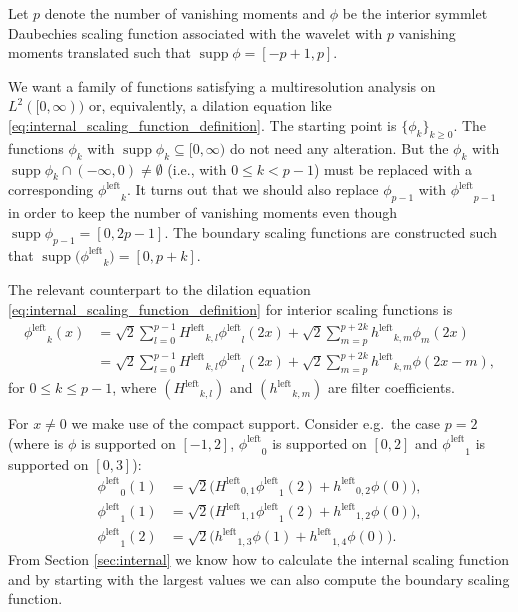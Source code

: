 \documentclass[a4paper]{scrartcl}
\newcommand\lphi{\ensuremath{\phi^{\text{left}}}}
\newcommand\lH{\ensuremath{H^{\text{left}}}}
\newcommand\lh{\ensuremath{h^{\text{left}}}}
\DeclareMathOperator\supp{supp}
\begin{document}
Let $p$ denote the number of vanishing moments and $\phi$ be the interior symmlet Daubechies scaling function associated with the wavelet with $p$ vanishing moments translated such that $\supp\phi = [-p+1, p]$.

We want a family of functions satisfying a multiresolution analysis on $L^2([0,\infty))$ or, equivalently, a dilation equation like \cref{eq:internal_scaling_function_definition}.
The starting point is $\{\phi_k\}_{k\geq 0}$.
The functions $\phi_k$ with $\supp\phi_k \subseteq [0,\infty)$ do not need any alteration.
But the $\phi_k$ with $\supp\phi_k \cap (-\infty,0) \neq \emptyset$ (i.e., with $0\leq k < p-1$) must be replaced with a corresponding $\lphi_k$.
It turns out that we should also replace $\phi_{p-1}$ with $\lphi_{p-1}$ in order to keep the number of vanishing moments even though $\supp\phi_{p-1} = [0,2p-1]$.
The boundary scaling functions are constructed such that $\supp\bigl(\lphi_k\bigr) = [0,p+k]$.

The relevant counterpart to the dilation equation \cref{eq:internal_scaling_function_definition} for interior scaling functions is
\begin{align}
	\lphi_k(x)
	& = \sqrt2 \sum_{l=0}^{p-1} \lH_{k,l} \lphi_l(2x) + \sqrt2 \sum_{m=p}^{p+2k} \lh_{k,m} \phi_m(2x)
	\nonumber
	\\
	& = \sqrt2 \sum_{l=0}^{p-1} \lH_{k,l} \lphi_l(2x) + \sqrt2 \sum_{m=p}^{p+2k} \lh_{k,m} \phi(2x-m),
	\label{eq:left_scaling_function_definition}
\end{align}
for $0\leq k\leq p-1$, where $(\lH_{k,l})$ and $(\lh_{k,m})$ are filter coefficients.

For $x \neq 0$ we make use of the compact support.
Consider e.g.\ the case $p=2$ (where is $\phi$ is supported on $[-1,2]$, $\lphi_0$ is supported on $[0,2]$ and $\lphi_1$ is supported on $[0,3]$):
\begin{align*}
	\lphi_0(1)
    & = \sqrt2 \bigl( \lH_{0,1} \lphi_1(2) + \lh_{0,2} \phi(0) \bigr),
	\\
	\lphi_1(1)
    & = \sqrt2 \bigl( \lH_{1,1} \lphi_1(2) + \lh_{1,2} \phi(0) \bigr),
	\\
	\lphi_1(2)
    & = \sqrt2 \bigl( \lh_{1,3} \phi(1) + \lh_{1,4} \phi(0) \bigr).
\end{align*}
From Section \ref{sec:internal} we know how to calculate the internal scaling function and by starting with the largest values we can also compute the boundary scaling function.
\end{document}
